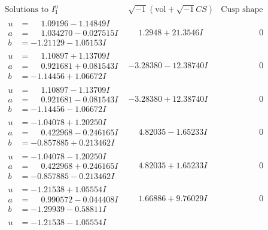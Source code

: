 \documentclass[1p]{elsarticle_modified}
\theoremstyle{definition}
\newcommand{\I}{\sqrt{-1}}
\begin{document}
$$\begin{array}{c|c|c}
\text{Solutions to }I^u_{1}& \I (\text{vol} + \sqrt{-1}CS) & \text{Cusp shape}\\
 \hline 
\begin{aligned}
u &= \phantom{-}1.09196 - 1.14849 I \\
a &= \phantom{-}1.034270 - 0.027515 I \\
b &= -1.21129 - 1.05153 I\end{aligned}
 & \phantom{-}1.2948 + 21.3546 I & \phantom{-0.000000 } 0 \\ \hline\begin{aligned}
u &= \phantom{-}1.10897 + 1.13709 I \\
a &= \phantom{-}0.921681 + 0.081543 I \\
b &= -1.14456 + 1.06672 I\end{aligned}
 & -3.28380 - 12.38740 I & \phantom{-0.000000 } 0 \\ \hline\begin{aligned}
u &= \phantom{-}1.10897 - 1.13709 I \\
a &= \phantom{-}0.921681 - 0.081543 I \\
b &= -1.14456 - 1.06672 I\end{aligned}
 & -3.28380 + 12.38740 I & \phantom{-0.000000 } 0 \\ \hline\begin{aligned}
u &= -1.04078 + 1.20250 I \\
a &= \phantom{-}0.422968 - 0.246165 I \\
b &= -0.857885 + 0.213462 I\end{aligned}
 & \phantom{-}4.82035 - 1.65233 I & \phantom{-0.000000 } 0 \\ \hline\begin{aligned}
u &= -1.04078 - 1.20250 I \\
a &= \phantom{-}0.422968 + 0.246165 I \\
b &= -0.857885 - 0.213462 I\end{aligned}
 & \phantom{-}4.82035 + 1.65233 I & \phantom{-0.000000 } 0 \\ \hline\begin{aligned}
u &= -1.21538 + 1.05554 I \\
a &= \phantom{-}0.990572 - 0.044408 I \\
b &= -1.29939 - 0.58811 I\end{aligned}
 & \phantom{-}1.66886 + 9.76029 I & \phantom{-0.000000 } 0 \\ \hline\begin{aligned}
u &= -1.21538 - 1.05554 I \\

\end{aligned}
\end{array}$$
\end{document}
